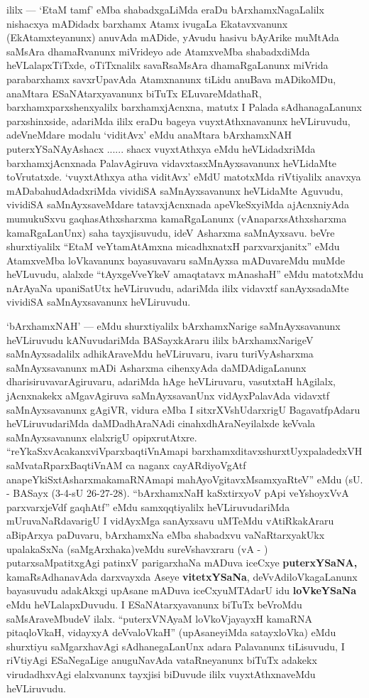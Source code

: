\begin{artha}
ililx --- `EtaM tamf' eMba shabadxgaLiMda eraDu bArxhamxNagaLalilx nishacxya mADidadx barxhamx Atamx ivugaLa Ekatavxvanunx (EkAtamxteyanunx) anuvAda mADide, yAvudu hasivu bAyArike muMtAda saMsAra dhamaRvanunx miVrideyo ade AtamxveMba shabadxdiMda heVLalapxTiTxde, oTiTxnalilx savaRsaMsAra dhamaRgaLanunx miVrida parabarxhamx savxrUpavAda Atamxnanunx tiLidu anuBava mADikoMDu, anaMtara ESaNAtarxyavanunx biTuTx ELuvareMdathaR, barxhamxparxshenxyalilx barxhamxjAcnxna, matutx I Palada sAdhanagaLanunx parxshinxside, adariMda ililx eraDu bageya vuyxtAthxnavanunx heVLiruvudu, adeVneMdare modalu `viditAvx' eMdu anaMtara bArxhamxNAH puterxYSaNAyAshacx ...... shacx vuyxtAthxya eMdu heVLidadxriMda barxhamxjAcnxnada PalavAgiruva vidavxtasxMnAyxsavanunx heVLidaMte toVrutatxde. `vuyxtAthxya atha viditAvx' eMdU matotxMda riVtiyalilx anavxya mADabahudAdadxriMda vividiSA saMnAyxsavanunx heVLidaMte Aguvudu, vividiSA saMnAyxsaveMdare tatavxjAcnxnada apeVkeSxyiMda ajAcnxniyAda mumukuSxvu gaqhasAthxsharxma kamaRgaLanunx (vAnaparxsAthxsharxma kamaRgaLanUnx) saha tayxjisuvudu, ideV Asharxma saMnAyxsavu. beVre shurxtiyalilx ``EtaM veYtamAtAmxna micadhxnatxH parxvarxjanitx'' eMdu AtamxveMba loVkavanunx bayasuvavaru saMnAyxsa mADuvareMdu muMde heVLuvudu, alalxde ``tAyxgeVveYkeV amaqtatavx mAnashaH'' eMdu matotxMdu nArAyaNa upaniSatUtx heVLiruvudu, adariMda ililx vidavxtf sanAyxsadaMte vividiSA saMnAyxsavanunx heVLiruvudu.
\end{artha}

\begin{artha}
`bArxhamxNAH' --- eMdu shurxtiyalilx bArxhamxNarige saMnAyxsavanunx heVLiruvudu kANuvudariMda BASayxkAraru ililx bArxhamxNarigeV saMnAyxsadalilx adhikAraveMdu heVLiruvaru, ivaru turiVyAsharxma saMnAyxsavanunx mADi Asharxma cihenxyAda daMDAdigaLanunx dharisiruvavarAgiruvaru, adariMda hAge heVLiruvaru, vasutxtaH hAgilalx, jAcnxnakekx aMgavAgiruva saMnAyxsavanUnx vidAyxPalavAda vidavxtf saMnAyxsavanunx  gAgiVR, vidura eMba I sitxrXVshUdarxrigU BagavatfpAdaru heVLiruvudariMda daMDadhAraNAdi cinahxdhAraNeyilalxde keVvala saMnAyxsavanunx elalxrigU opipxrutAtxre. ``reYkaSxvAcakanxviVparxbaqtiVnAmapi barxhamxditavxshurxtUyxpaladedxVH saMvataRparxBaqtiVnAM ca naganx cayARdiyoVgAtf anapeYkiSxtAsharxmakamaRNAmapi mahAyoVgitavxMsamxyaRteV'' eMdu (sU. - BASayx (3-4-sU 26-27-28). ``bArxhamxNaH kaSxtirxyoV pApi veYshoyxVvA parxvarxjeVdf gaqhAtf'' eMdu samxqqtiyalilx heVLiruvudariMda mUruvaNaRdavarigU I vidAyxMga sanAyxsavu uMTeMdu vAtiRkakAraru aBipArxya paDuvaru, bArxhamxNa eMba shabadxvu vaNaRtarxyakUkx upalakaSxNa (saMgArxhaka)veMdu sureVshavxraru (vA - ) putarxsaMpatitxgAgi patinxV parigarxhaNa mADuva iceCxye {\bf puterxYSaNA,} kamaRsAdhanavAda darxvayxda Aseye {\bf vitetxYSaNa}, deVvAdiloVkagaLanunx bayasuvudu adakAkxgi upAsane mADuva iceCxyuMTAdarU idu {\bf loVkeYSaNa} eMdu heVLalapxDuvudu. I ESaNAtarxyavanunx biTuTx beVroMdu saMsAraveMbudeV ilalx. ``puterxVNAyaM loVkoVjayayxH kamaRNA pitaqloVkaH, vidayxyA deVvaloVkaH'' (upAsaneyiMda satayxloVka) eMdu shurxtiyu saMgarxhavAgi sAdhanegaLanUnx adara Palavanunx tiLisuvudu, I riVtiyAgi ESaNegaLige anuguNavAda vataRneyanunx biTuTx adakekx virudadhxvAgi elalxvanunx tayxjisi biDuvude ililx vuyxtAthxnaveMdu heVLiruvudu.
\end{artha}


